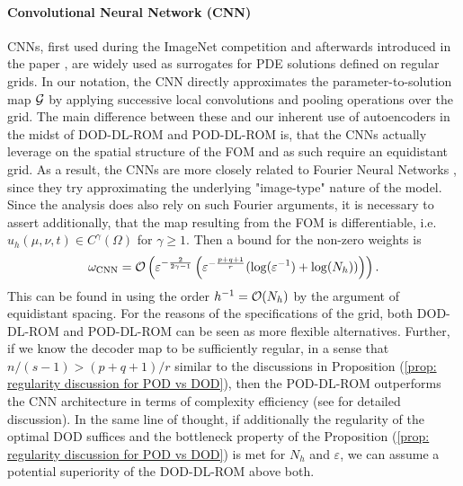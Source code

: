 \paragraph{Convolutional Neural Network (CNN)}

CNNs, first used during the ImageNet competition and afterwards introduced
in the paper \cite{krizhevsky2012}, are widely used as surrogates for PDE solutions 
defined on regular grids. In our notation, the CNN directly approximates the parameter-to-solution
map $\mathcal{G}$ by applying successive local convolutions and pooling operations over the grid.
The main difference between these and our inherent use of autoencoders in the midst of 
DOD-DL-ROM and POD-DL-ROM is, that the CNNs actually leverage on the spatial structure of
the FOM and as such require an equidistant grid. As a result, the CNNs are more closely
related to Fourier Neural Networks \cite{kovachki2021}, since they try approximating
the underlying "image-type" nature of the model. Since the analysis does also rely on
such Fourier arguments, it is necessary to assert additionally, that the map resulting
from the FOM is differentiable, i.e. $u_h(\mu, \nu, t) \in C^\gamma(\Omega)$ for $\gamma \geq 1$. Then
a bound for the non-zero weights is
\begin{equation*}
    \omega_\text{CNN} = \mathcal{O}\left( \varepsilon^{-\frac{2}{2\gamma - 1}} \left( 
        \varepsilon^{-\frac{p+q+1}{r}} (\log(\varepsilon^{-1}) + \log(N_h))
    \right)\right).
\end{equation*}
This can be found in \cite{brivio2023} using the order $h^{-1} = \mathcal{O}(N_h)$ by the argument
of equidistant spacing. For the reasons of the specifications of the grid, both DOD-DL-ROM and
POD-DL-ROM can be seen as more flexible alternatives. Further, if we know the decoder map to be sufficiently
regular, in a sense that $n/(s-1) > (p+q+1)/r$ similar to the discussions in 
Proposition (\ref{prop: regularity discussion for POD vs DOD}), then the POD-DL-ROM outperforms the
CNN architecture in terms of complexity efficiency (see \cite{brivio2023} for detailed discussion). 
In the same line of thought, if additionally the regularity of the optimal DOD
suffices and the bottleneck property of the Proposition (\ref{prop: regularity discussion for POD vs DOD})
is met for $N_h$ and $\varepsilon$, we can assume a potential superiority of the DOD-DL-ROM above both.